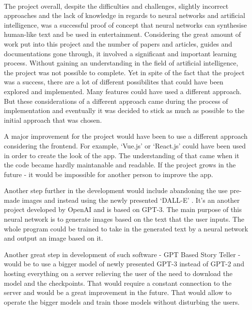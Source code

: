 \documentclass[12pt]{report}
\begin{document}
\paragraph{}
The project overall, despite the difficulties and challenges, slightly incorrect approaches and the lack of knowledge
in regards to neural networks and artificial intelligence, was a successful proof of concept that neural networks can
synthesise human-like text and be used in entertainment. Considering the great amount of work put into this project and
the number of papers and articles, guides and documentations gone through, it involved a significant and important learning process.
Without gaining an understanding in the field of artificial intelligence, the project was not possible to complete. Yet
in spite of the fact that the project was a success, there are a lot of different possibilites that could have been
explored and implemented. Many features could have used a different approach. But these considerations of a different approach 
came during the process of implementation and eventually it was decided to stick as much as possible to the initial approach that was chosen.

A major improvement for the project would have been to use a different approach considering the frontend. For example,
`Vue.js' or `React.js' could have been used in order to create the look of the app. The understanding of that came when
it the code became hardly maintanable and readable. If the project grows in the future - it would be impossible for another
person to improve the app.

Another step further in the development would include abandoning the use pre-made images and instead using the
newly presented `DALL-E' \citep{ramesh_2021_zeroshot}. It's an another project developed by OpenAI and is based on GPT-3. The main purpose of this
neural network is to generate images based on the text that the user inputs. The whole program could be trained to
take in the generated text by a neural network and output an image based on it.

Another great step in development of such software - GPT Based Story Teller - would be to use a bigger model of newly presented
GPT-3 instead of GPT-2 and hosting everything on a server relieving the user of the need to download the model and the checkpoints.
That would require a constant connection to the server and would be a great improvement in the future. That would allow
to operate the bigger models and train those models without disturbing the users.
\end{document}
